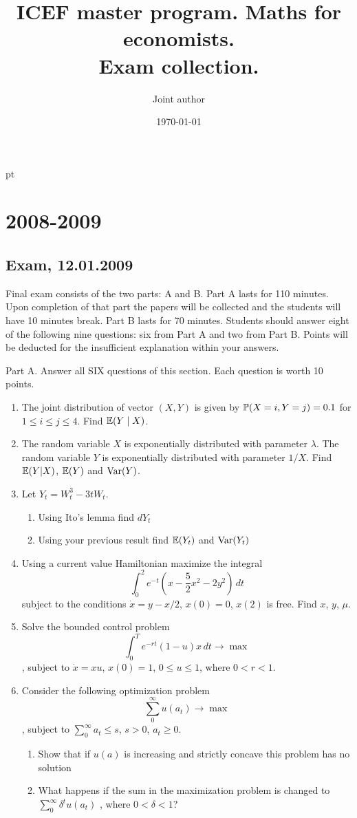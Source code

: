 \documentclass[pdftex,12pt,a4paper]{article}
\title{ICEF master program. Maths for economists. \\Exam collection.}
\author{Joint author}
\date{\today}
\begin{document}
 pt %

\maketitle
\tableofcontents

\section{2008-2009}

\subsection{Exam, 12.01.2009}

Final exam consists of the two parts: A and B. Part A lasts for 110 minutes.
Upon completion of that part the papers will be collected and the students will have 10 minutes break. 
Part B lasts for 70 minutes.
Students should answer eight of the following nine questions: six from Part A  and two from Part B. 
Points will be deducted for the insufficient explanation within your answers.

Part A.
Answer all SIX questions of this section. Each question is worth 10 points.

\begin{enumerate}
\item The joint distribution of vector $(X,Y)$ is given by $\P(X=i,Y=j)=0.1$  for $1\leq i\leq j\leq 4$. Find $\E(Y\mid X)$.
\item The random variable $X$ is exponentially distributed with parameter $\lambda$. The random variable $Y$ is exponentially distributed with parameter $1/X$. Find $\E(Y|X)$, $\E(Y)$  and $\Var(Y)$.
\item Let $Y_t=W_t^3-3tW_t$.
\begin{enumerate}
\item Using Ito’s lemma find $dY_t$
\item Using your previous result find $\E(Y_t)$ and $\Var(Y_t)$
\end{enumerate}

\item Using a current value Hamiltonian maximize the integral 
\[
\int_0^2 e^{-t}\left(x-\frac{5}{2}x^2-2y^2\right)\, dt
\]
subject to the conditions $\dot{x}=y-x/2$, $x(0)=0$, $x(2)$ is free. Find $x$, $y$, $\mu$.
\item Solve the bounded control problem 
\[
\int_0^T e^{-rt}(1-u)x\, dt \to \max 
\]
, subject to $\dot{x}=xu$, $x(0)=1$, $0\leq u\leq 1$, where $0<r<1$.
\item Consider the following optimization problem 
\[
\sum_0^{\infty} u(a_t) \to \max
\]
, subject to $\sum_0^{\infty}a_t \leq s$, $s>0$, $a_t \geq 0$.
\begin{enumerate}
\item Show that if $u(a)$ is increasing and strictly concave this problem has no solution
\item What happens if the sum in the maximization problem is changed to $\sum_0^{\infty} \delta^t u(a_t)$ , where $0<\delta<1$? 
\end{enumerate}


\end{enumerate}
\end{document}
